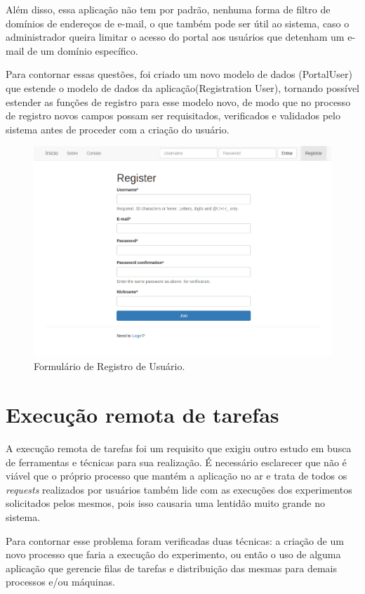 \documentclass[tg]{mdtufsm}
\begin{document}
Além disso, essa aplicação não tem por padrão, nenhuma forma de filtro de domínios de endereços de e-mail, o que também pode ser útil ao sistema, caso o administrador queira limitar o acesso do portal aos usuários que detenham um e-mail de um domínio específico.

Para contornar essas questões, foi criado um novo modelo de dados (PortalUser) que estende o modelo de dados da aplicação(Registration User), tornando possível estender as funções de registro para esse modelo novo, de modo que no processo de registro novos campos possam ser requisitados, verificados e validados pelo sistema antes de proceder com a criação do usuário.

\begin{figure}
	\centering
	\includegraphics[width=1\textwidth]{registro}
	\caption{
		Formulário de Registro de Usuário.
	}
	\label{fig:home}
\end{figure}

\section{Execução remota de tarefas}
A execução remota de tarefas foi um requisito que exigiu outro estudo em busca de ferramentas e técnicas para sua realização. É necessário esclarecer que não é viável que o próprio processo que mantém a aplicação no ar e trata de todos os \emph{requests} realizados por usuários também lide com as execuções dos experimentos solicitados pelos mesmos, pois isso causaria uma lentidão muito grande no sistema.

Para contornar esse problema foram verificadas duas técnicas: a criação de um novo processo que faria a execução do experimento, ou então o uso de alguma aplicação que gerencie filas de tarefas e distribuição das mesmas para demais processos e/ou máquinas.
\end{document}
